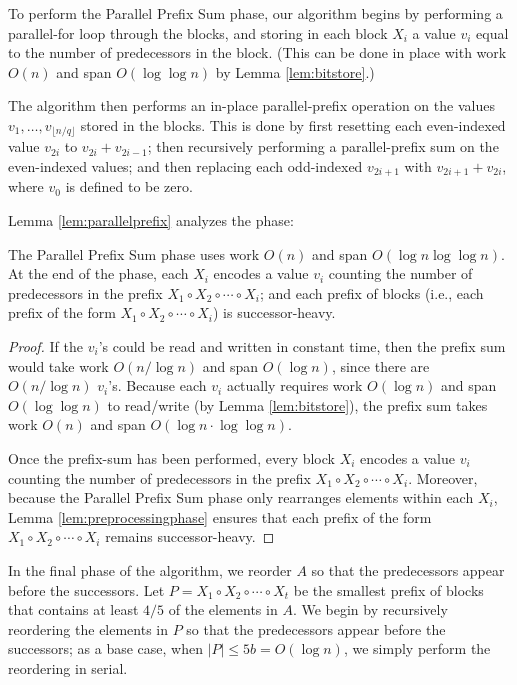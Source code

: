 \documentclass[a4paper,UKenglish,cleveref, autoref, thm-restate]{lipics-v2019}
\renewcommand{\paragraph}[1]{\vspace{0.09in}\noindent{\bf \boldmath #1.}}
\begin{document}
To perform the Parallel Prefix Sum phase, our algorithm begins by
performing a parallel-for loop through the blocks, and storing in each
block $X_i$ a value $v_i$ equal to the number of predecessors in the
block. (This can be done in place with work $O(n)$ and span $O(\log
\log n)$ by Lemma \ref{lem:bitstore}.)

The algorithm then performs an in-place parallel-prefix operation on
the values $v_1, \ldots, v_{\lfloor n / q \rfloor}$ stored in the
blocks. This is done by first resetting each even-indexed value
$v_{2i}$ to $v_{2i} + v_{2i - 1}$; then recursively performing a
parallel-prefix sum on the even-indexed values; and then replacing
each odd-indexed $v_{2i + 1}$ with $v_{2i + 1} + v_{2i}$, where $v_0$
is defined to be zero.

Lemma \ref{lem:parallelprefix} analyzes the phase:
\begin{lemma}
  The Parallel Prefix Sum phase uses work $O(n)$ and span
  $O(\log n \log \log n)$. At the end of the phase, each $X_i$ encodes
  a value $v_i$ counting the number of predecessors in the prefix
  $X_1 \circ X_2 \circ \cdots \circ X_i$; and each prefix of blocks
  (i.e., each prefix of the form
  $X_1 \circ X_2 \circ \cdots \circ X_i$) is successor-heavy.
\label{lem:parallelprefix}
\end{lemma}
\begin{proof}
If the $v_i$'s could be read and written in constant time, then the
prefix sum would take work $O(n / \log n)$ and span $O(\log n)$, since
there are $O(n / \log n)$ $v_i$'s. Because each $v_i$ actually
requires work $O(\log n)$ and span $O(\log \log n)$ to read/write (by
Lemma \ref{lem:bitstore}), the prefix sum takes work $O(n)$ and span
$O(\log n \cdot \log \log n)$.

Once the prefix-sum has been performed, every block $X_i$
encodes a value $v_i$ counting the number of predecessors in the
prefix $X_1 \circ X_2 \circ \cdots \circ X_i$. Moreover, because the
Parallel Prefix Sum phase only rearranges elements within each $X_i$,
Lemma \ref{lem:preprocessingphase} ensures that each prefix of the
form $X_1 \circ X_2 \circ \cdots \circ X_i$ remains successor-heavy.
\end{proof}

\paragraph{In-Place Reordering}
In the final phase of the algorithm, we reorder $A$ so that the
predecessors appear before the successors. Let $P = X_1 \circ X_2
\circ \cdots \circ X_t$ be the smallest prefix of blocks that contains
at least $4/5$ of the elements in $A$. We begin by recursively
reordering the elements in $P$ so that the predecessors appear before
the successors; as a base case, when $|P| \le 5b = O(\log n)$, we
simply perform the reordering in serial.
\end{document}
